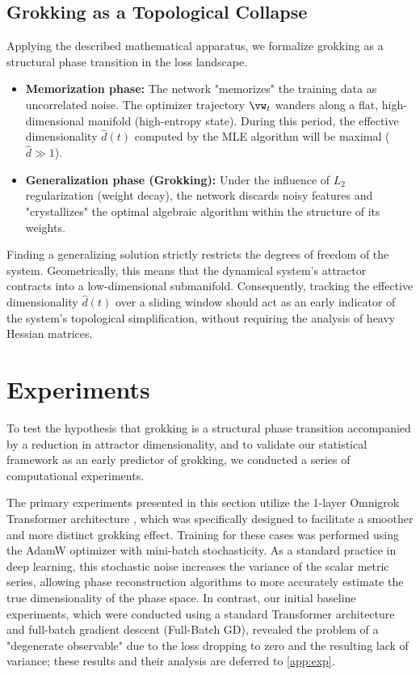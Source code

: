 \documentclass{article}
\begin{document}
\subsection{Grokking as a Topological Collapse}\label{sec:theory_grokking}

Applying the described mathematical apparatus, we formalize grokking as a structural phase transition in the loss landscape.
\begin{itemize}
    \item \textbf{Memorization phase:} The network "memorizes" the training data as uncorrelated noise. The optimizer trajectory $\vw_t$ wanders along a flat, high-dimensional manifold (high-entropy state). During this period, the effective dimensionality $\hat{d}(t)$ computed by the MLE algorithm will be maximal ($\hat{d} \gg 1$).
    \item \textbf{Generalization phase (Grokking):} Under the influence of $L_2$ regularization (weight decay), the network discards noisy features and "crystallizes" the optimal algebraic algorithm within the structure of its weights.
\end{itemize}

Finding a generalizing solution strictly restricts the degrees of freedom of the system. Geometrically, this means that the dynamical system's attractor contracts into a low-dimensional submanifold. Consequently, tracking the effective dimensionality $\hat{d}(t)$ over a sliding window should act as an early indicator of the system's topological simplification, without requiring the analysis of heavy Hessian matrices.










\section{Experiments}\label{sec:exp}

To test the hypothesis that grokking is a structural phase transition accompanied by a reduction in attractor dimensionality, and to validate our statistical framework as an early predictor of grokking, we conducted a series of computational experiments.

The primary experiments presented in this section utilize the 1-layer Omnigrok Transformer architecture \citep{liu2022omnigrok}, which was specifically designed to facilitate a smoother and more distinct grokking effect. Training for these cases was performed using the AdamW optimizer with mini-batch stochasticity. As a standard practice in deep learning, this stochastic noise increases the variance of the scalar metric series, allowing phase reconstruction algorithms to more accurately estimate the true dimensionality of the phase space. In contrast, our initial baseline experiments, which were conducted using a standard Transformer architecture and full-batch gradient descent (Full-Batch GD), revealed the problem of a "degenerate observable" due to the loss dropping to zero and the resulting lack of variance; these results and their analysis are deferred to \cref{app:exp}.
\end{document}
